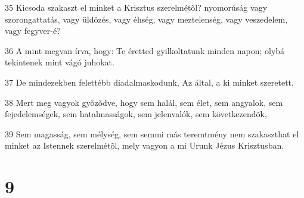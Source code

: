 \par 35 Kicsoda szakaszt el minket a Krisztus szerelmétõl? nyomorúság vagy szorongattatás, vagy üldözés, vagy éhség, vagy meztelenség, vagy veszedelem, vagy fegyver-é?
\par 36 A mint megvan írva, hogy: Te éretted gyilkoltatunk minden napon; olybá tekintenek mint vágó juhokat.
\par 37 De mindezekben felettébb diadalmaskodunk, Az által, a ki minket szeretett,
\par 38 Mert meg vagyok gyõzõdve, hogy sem halál, sem élet, sem angyalok, sem fejedelemségek, sem hatalmasságok, sem jelenvalók, sem következendõk,
\par 39 Sem magasság, sem mélység, sem semmi más teremtmény nem szakaszthat el minket az Istennek szerelmétõl, mely vagyon a mi Urunk Jézus Krisztusban.

\chapter{9}

